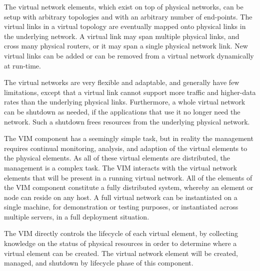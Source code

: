 The virtual network elements, which exist on top of physical networks,
can be setup with arbitrary topologies and with an arbitrary number of
end-points. The virtual links in a virtual topology are eventually
mapped onto physical links in the underlying network. A virtual link
may span multiple physical links, and cross many physical routers, or
it may span a single physical network link. New virtual links can be
added or can be removed from a virtual network dynamically at
run-time.

The virtual networks are very flexible and adaptable, and generally
have few limitations, except that a virtual link cannot support more
traffic and higher-data rates than the underlying physical
links. Furthermore, a whole virtual network can be shutdown as needed,
if the applications that use it no longer need the network. Such a
shutdown frees resources from the underlying physical network.


The VIM component has a seemingly simple task, but in reality the
management requires continual monitoring, analysis, and adaption of
the virtual elements to the physical elements. As all of these virtual
elements are distributed, the management is a complex task.
The VIM interacts with the virtual network
elements that will be present in a running virtual network. All of the
elements of the VIM component constitute a fully distributed system,
whereby an element or node can reside on any host. A full virtual
network can be instantiated on a single machine, for demonstration or
testing purposes, or instantiated across multiple servers, in a full
deployment situation.

The VIM directly controls the lifecycle of each virtual element, by
collecting knowledge on the status of physical resources in order to
determine where a virtual element can be created. The virtual network
element will be created, managed, and shutdown by lifecycle phase of
this component.

